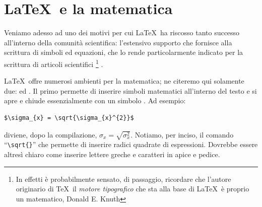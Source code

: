 \section{\LaTeX\ e la matematica}

Veniamo adesso ad uno dei motivi per cui \LaTeX\ ha riscosso tanto successo
all'interno della comunit\`a scientifica: l'estensivo supporto che fornisce
alla scrittura di simboli ed equazioni, che lo rende particolarmente indicato
per la scrittura di articoli scientifici%
\footnote{
In effetti \`e probabilmente sensato, di passaggio, ricordare che l'autore
originario di \TeX\, il \emph{motore tipografico} che sta alla base di \LaTeX\
\`e proprio un matematico, Donald E. Knuth}%
.

\LaTeX\ offre numerosi ambienti per la matematica; ne citeremo qui solamente
due: \cchar{math} ed \cchar{equation}. Il primo permette di inserire simboli
matematici all'interno del testo e si apre e chiude essenzialmente con un
simbolo \cchar{\$}. Ad esempio:
\begin{verbatim}
$\sigma_{x} = \sqrt{\sigma_{x}^{2}}$
\end{verbatim}
diviene, dopo la compilazione, $\sigma_{x} = \sqrt{\sigma_{x}^{2}}$.
Notiamo, per inciso, il comando ``\verb|\sqrt{}|'' che permette di inserire
radici quadrate di espressioni. Dovrebbe essere altres\`i chiaro
come inserire lettere greche e caratteri in apice e pedice.

